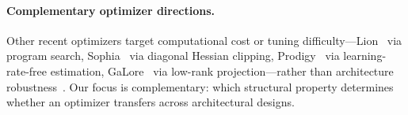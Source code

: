 \paragraph{Complementary optimizer directions.}
Other recent optimizers target computational cost or tuning difficulty---Lion~\cite{chen2024lion} via program search, Sophia~\cite{liu2024sophia} via diagonal Hessian clipping, Prodigy~\cite{mishchenko2024prodigy} via learning-rate-free estimation, GaLore~\cite{zhao2024galore} via low-rank projection---rather than architecture robustness~\citep{defazio2024road}. Our focus is complementary: which structural property determines whether an optimizer transfers across architectural designs.
